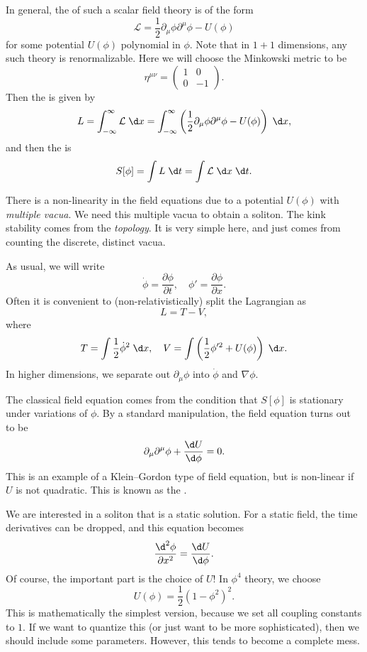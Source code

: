 \documentclass[a4paper]{article}
\begin{document}
In general, the  of such a scalar field theory is of the form
\[
  \mathcal{L} = \frac{1}{2} \partial_\mu \phi \partial^\mu \phi - U(\phi)
\]
for some potential $U(\phi)$ polynomial in $\phi$. Note that in $1 + 1$ dimensions, any such theory is renormalizable. Here we will choose the Minkowski metric to be
\[
  \eta^{\mu\nu} =
  \begin{pmatrix}
    1 & 0\\
    0 & -1
  \end{pmatrix}.
\]
Then the  is given by
\[
  L = \int_{-\infty}^\infty \mathcal{L}\;\d x = \int_{-\infty}^\infty \left(\frac{1}{2} \partial_\mu \phi \partial^\mu \phi - U(\phi)\right)\;\d x,
\]
and then the  is
\[
  S[\phi] = \int L\;\d t = \int \mathcal{L} \;\d x\;\d t.
\]

There is a non-linearity in the field equations due to a potential $U(\phi)$ with \emph{multiple vacua}. We need this multiple vacua to obtain a soliton. The kink stability comes from the \emph{topology}. It is very simple here, and just comes from counting the discrete, distinct vacua.

As usual, we will write
\[
  \dot{\phi} = \frac{\partial \phi}{\partial t},\quad \phi' = \frac{\partial \phi}{\partial x}.
\]
Often it is convenient to (non-relativistically) split the Lagrangian as
\[
  L = T - V,
\]
where
\[
  T = \int \frac{1}{2} \dot{\phi}^2\;\d x,\quad V = \int \left(\frac{1}{2} \phi'^2 + U(\phi)\right)\;\d x.
\]
In higher dimensions, we separate out $\partial_\mu \phi$ into $\dot{\phi}$ and $\nabla \phi$.

The classical field equation comes from the condition that $S[\phi]$ is stationary under variations of $\phi$. By a standard manipulation, the field equation turns out to be
\[
  \partial_\mu \partial^\mu \phi + \frac{\d U}{\d \phi} = 0.
\]
This is an example of a Klein--Gordon type of field equation, but is non-linear if $U$ is not quadratic. This is known as the .

We are interested in a soliton that is a static solution. For a static field, the time derivatives can be dropped, and this equation becomes
\[
  \frac{\d^2 \phi}{\partial x^2} = \frac{\d U}{\d \phi}.
\]
Of course, the important part is the choice of $U$! In $\phi^4$ theory, we choose
\[
  U(\phi) = \frac{1}{2} (1 - \phi^2)^2.
\]
This is mathematically the simplest version, because we set all coupling constants to $1$. If we want to quantize this (or just want to be more sophisticated), then we should include some parameters. However, this tends to become a complete mess.
\end{document}
